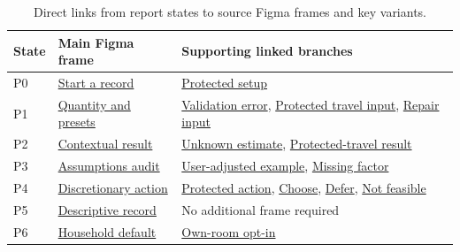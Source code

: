 \documentclass[12pt,a4paper]{article}
\begin{document}
\begin{table}[H]
\centering\small
\caption{Direct links from report states to source Figma frames and key variants.}
\label{tab:figma-frame-links}
\begin{tabularx}{\textwidth}{@{}p{1.25cm}p{4.6cm}X@{}}
\toprule
\textbf{State}&\textbf{Main Figma frame}&\textbf{Supporting linked branches}\\
\midrule
P0 & \href{https://www.figma.com/design/L1kEH28shvU8494m2Y7EnT?node-id=4-12}{Start a record} & \href{https://www.figma.com/design/L1kEH28shvU8494m2Y7EnT?node-id=4-22}{Protected setup}\\
P1 & \href{https://www.figma.com/design/L1kEH28shvU8494m2Y7EnT?node-id=4-32}{Quantity and presets} & \href{https://www.figma.com/design/L1kEH28shvU8494m2Y7EnT?node-id=4-42}{Validation error}, \href{https://www.figma.com/design/L1kEH28shvU8494m2Y7EnT?node-id=5-2}{Protected travel input}, \href{https://www.figma.com/design/L1kEH28shvU8494m2Y7EnT?node-id=5-12}{Repair input}\\
P2 & \href{https://www.figma.com/design/L1kEH28shvU8494m2Y7EnT?node-id=4-52}{Contextual result} & \href{https://www.figma.com/design/L1kEH28shvU8494m2Y7EnT?node-id=4-62}{Unknown estimate}, \href{https://www.figma.com/design/L1kEH28shvU8494m2Y7EnT?node-id=5-22}{Protected-travel result}\\
P3 & \href{https://www.figma.com/design/L1kEH28shvU8494m2Y7EnT?node-id=4-72}{Assumptions audit} & \href{https://www.figma.com/design/L1kEH28shvU8494m2Y7EnT?node-id=4-82}{User-adjusted example}, \href{https://www.figma.com/design/L1kEH28shvU8494m2Y7EnT?node-id=5-32}{Missing factor}\\
P4 & \href{https://www.figma.com/design/L1kEH28shvU8494m2Y7EnT?node-id=4-92}{Discretionary action} & \href{https://www.figma.com/design/L1kEH28shvU8494m2Y7EnT?node-id=4-102}{Protected action}, \href{https://www.figma.com/design/L1kEH28shvU8494m2Y7EnT?node-id=5-42}{Choose}, \href{https://www.figma.com/design/L1kEH28shvU8494m2Y7EnT?node-id=5-52}{Defer}, \href{https://www.figma.com/design/L1kEH28shvU8494m2Y7EnT?node-id=5-62}{Not feasible}\\
P5 & \href{https://www.figma.com/design/L1kEH28shvU8494m2Y7EnT?node-id=4-112}{Descriptive record} & No additional frame required\\
P6 & \href{https://www.figma.com/design/L1kEH28shvU8494m2Y7EnT?node-id=4-122}{Household default} & \href{https://www.figma.com/design/L1kEH28shvU8494m2Y7EnT?node-id=4-132}{Own-room opt-in}\\
\bottomrule
\end{tabularx}
\end{table}
\end{document}
